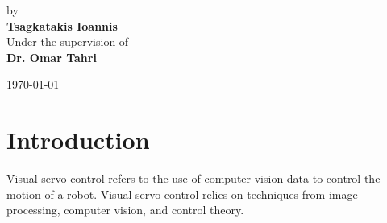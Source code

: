 \documentclass[a4paper,12pt]{article}
\begin{document}
\begin{center}
{ \Large 
        by \\[0.25cm]
        \textbf{Tsagkatakis Ioannis} \\[1.5cm]
        Under the supervision of \\[0.25cm]
        \textbf{Dr. Omar Tahri} \\
}
\end{center}
\vspace*{2cm}
\begin{center}
        \today
\end{center}
\newpage
\tableofcontents 
\section{Introduction}
Visual servo control refers to the use of computer vision data to control  the  motion  of  a  robot. Visual servo control relies on techniques from image processing,  computer  vision,  and  control  theory.   
\end{document}
